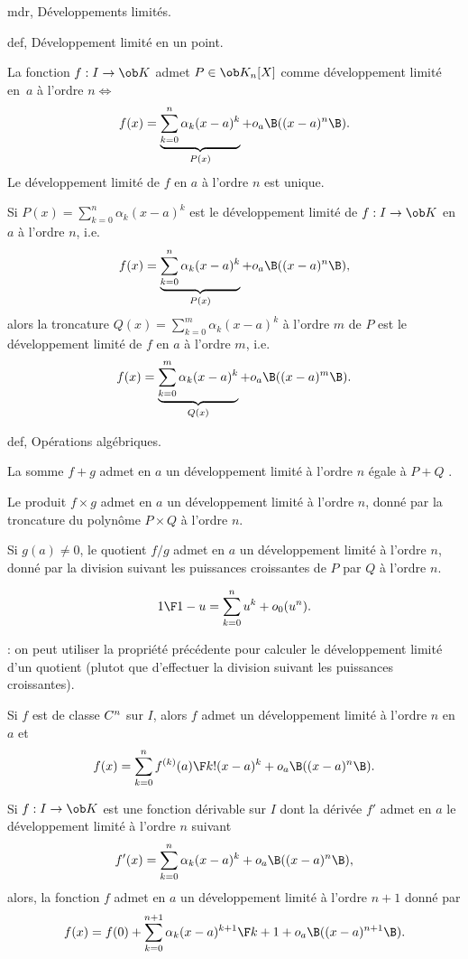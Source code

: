 \Section mdr, Développements limités. 

\Subsection def, Développement limité en un point. 
\bigskip

\Definition [$a\in i$ intervalle] 
La fonction $f:I\to\ob K$ admet $P\in\ob K_n[X]$ comme développement limité en~$a$ à l'ordre $n\Leftrightarrow$ 
$$
f(x)=\underbrace{\sum_{k=0}^n\alpha_k(x-a)^k}_{P(x)}+o_a\B((x-a)^n\B).
$$
Le développement limité de $f$ en $a$ à l'ordre $n$ est unique. 
\bigskip

\Propriete [$a\in i$ intervalle, $0\le m\le n$] 
Si $P(x)=\sum_{k=0}^n\alpha_k(x-a)^k$ est le développement limité de $f:I\to\ob K$ en $a$ à l'ordre $n$, i.e. 
$$
f(x)=\underbrace{\sum_{k=0}^n\alpha_k(x-a)^k}_{P(x)}+o_a\B((x-a)^n\B), 
$$
alors la troncature $Q(x)=\sum_{k=0}^m\alpha_k(x-a)^k$ à l'ordre $m$ de $P$ est le développement limité 
de $f$ en $a$ à l'ordre $m$, i.e. 
$$
f(x)=\underbrace{\sum_{k=0}^m\alpha_k(x-a)^k}_{Q(x)}+o_a\B((x-a)^m\B).
$$


\Subsection def, Opérations algébriques. 

La somme $f+g$ admet en $a$ un développement limité à l'ordre $n$ égale à $P+Q$ . 


Le produit $f\times g$ admet en $a$ un développement limité à l'ordre $n$, donné par la troncature du polynôme $P\times Q$ à l'ordre $n$. 

Si $g(a)\neq0$, le quotient $f/g$ admet en $a$ un développement limité à l'ordre $n$, donné par la division suivant les puissances croissantes de $P$ par $Q$ à l'ordre $n$. 


\Propriete [$n\ge0$] 
$$
{1\F 1-u}=\sum_{k=0}^nu^k+o_0(u^n).
$$

\Remarque : on peut utiliser la propriété précédente pour calculer le développement limité d'un quotient (plutot que d'effectuer la division suivant les puissances croissantes). 
\bigskip

\Theoreme [$a\in I$ intervalle]
Si $f$ est de classe $\sc C^n$ sur $I$, alors $f$ admet un développement limité à l'ordre $n$ en $a$ et 
$$
f(x)=\sum_{k=0}^n{f^{(k)}(a)\F k!}(x-a)^k+o_a\B((x-a)^n\B).
$$

\Propriete [$a\in I$ intervalle]
Si $f:I\to\ob K$ est une fonction dérivable sur $I$ dont la dérivée $f'$ admet en $a$ le développement limité à l'ordre $n$ suivant 
$$
f'(x)=\sum_{k=0}^n\alpha_k(x-a)^k+o_a\B((x-a)^n\B), 
$$
alors, la fonction $f$ admet en $a$ un développement limité à l'ordre $n+1$ donné par 
$$
f(x)=f(0)+\sum_{k=0}^{n+1}\alpha_k{(x-a)^{k+1}\F k+1}+o_a\B((x-a)^{n+1}\B).
$$

